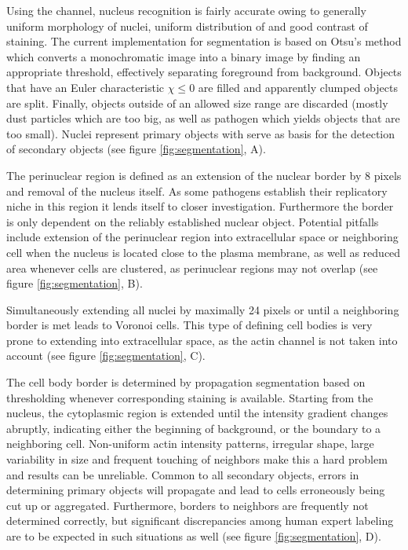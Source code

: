 \begin{description}[leftmargin=0.5cm]
\item[Nuclei:] Using the  channel, nucleus recognition is fairly accurate owing to generally uniform morphology of nuclei, uniform distribution of  and good contrast of  staining. The current implementation for segmentation is based on Otsu's method which converts a monochromatic image into a binary image by finding an appropriate threshold, effectively separating foreground from background. Objects that have an Euler characteristic $\chi \le 0$ are filled and apparently clumped objects are split. Finally, objects outside of an allowed size range are discarded (mostly dust particles which are too big, as well as pathogen  which yields objects that are too small). Nuclei represent primary objects with serve as basis for the detection of secondary objects (see figure \ref{fig:segmentation}, A).
\item[PeriNuclei:] The perinuclear region is defined as an extension of the nuclear border by 8 pixels and removal of the nucleus itself. As some pathogens establish their replicatory niche in this region it lends itself to closer investigation. Furthermore the border is only dependent on the reliably established nuclear object. Potential pitfalls include extension of the perinuclear region into extracellular space or neighboring cell when the nucleus is located close to the plasma membrane, as well as reduced area whenever cells are clustered, as perinuclear regions may not overlap (see figure \ref{fig:segmentation}, B).
\item[VoronoiCells:] Simultaneously extending all nuclei by maximally 24 pixels or until a neighboring border is met leads to Voronoi cells. This type of defining cell bodies is very prone to extending into extracellular space, as the actin channel is not taken into account (see figure \ref{fig:segmentation}, C).
\item[Cells:] The cell body border is determined by propagation segmentation based on thresholding whenever corresponding staining is available. Starting from the nucleus, the cytoplasmic region is extended until the intensity gradient changes abruptly, indicating either the beginning of background, or the boundary to a neighboring cell. Non-uniform actin intensity patterns, irregular shape, large variability in size and frequent touching of neighbors make this a hard problem and results can be unreliable. Common to all secondary objects, errors in determining primary objects will propagate and lead to cells erroneously being cut up or aggregated. Furthermore, borders to neighbors are frequently not determined correctly, but significant discrepancies among human expert labeling are to be expected in such situations as well (see figure \ref{fig:segmentation}, D).

\end{description}
